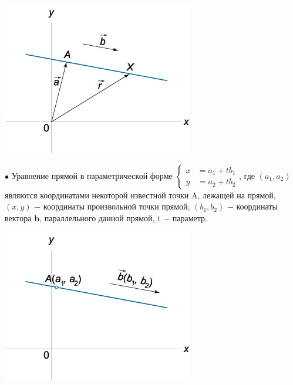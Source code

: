\documentclass[oneside]{book}
\begin{document}
\begin{enumerate}
\begin{itemize}
\begin{enumerate}
\begin{center}
\includegraphics[scale=0.4]{./pics/12.jpg}
\end{center}

$\bullet$ Уравнение прямой в параметрической форме
$\left\{ \begin{aligned} x &= {a_1} + t{b_1} \\ y &= {a_2} + t{b_2} \end{aligned} \right.$,
где $\left( {{a_1},{a_2}} \right)$ являются координатами некоторой известной точки A, лежащей на прямой, $\left( {x,y} \right)$ − координаты произвольной точки прямой, $\left( {{b_1},{b_2}} \right)$ − координаты вектора $\mathbf{b}$, параллельного данной прямой, t − параметр.
\begin{center}
\includegraphics[scale=0.4]{./pics/13.jpg}
\end{center}


\end{enumerate}
\end{itemize}
\end{enumerate}
\end{document}
